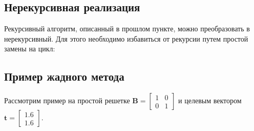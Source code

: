 \begin{algorithmic}

\end{algorithmic}

\subsection{Нерекурсивная реализация}

Рекурсивный алгоритм, описанный в прошлом пункте, можно преобразовать в нерекурсивный. Для этого необходимо избавиться от рекурсии путем простой замены на цикл: 

\begin{algorithmic}

\EndFor
\end{algorithmic}

\subsection{Пример жадного метода}

Рассмотрим пример на простой решетке $ \mathbf{B} = \left[\begin{array}{cccc}
1 & 0 \\
0 & 1
\end{array}\right] $ и целевым вектором $ \mathbf{t} = \left[\begin{array}{cccc}
1.6 \\
1.6
\end{array}\right] $.

